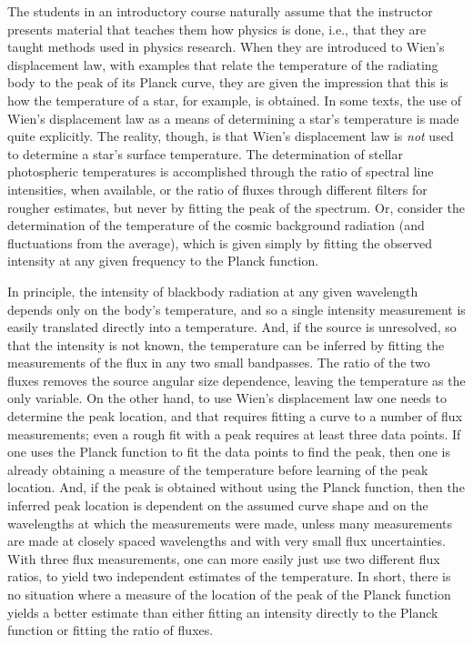\documentclass[12pt,aps,prb,preprint]{revtex4}   %
\begin{document}
The students in an introductory course naturally assume that the instructor presents material that teaches them how physics is done, i.e., that they are taught methods used in physics research.   When they are introduced to Wien's displacement law, with examples that relate the temperature of the radiating body to the peak of its Planck curve, they are given the impression that this is how the temperature of a star, for example, is obtained. In some texts, the use of Wien's displacement law as a means of determining a star's temperature is made quite explicitly.\cite{AS,CM,Hester}  The reality, though, is that Wien's displacement law is {\it not} used to determine a star's surface temperature.  The determination of stellar photospheric temperatures is accomplished through the ratio of spectral line intensities, when available, or the ratio of fluxes through different filters for rougher estimates, but never by fitting the peak of the spectrum.  Or, consider the determination of the temperature of the cosmic background radiation (and fluctuations from the average), which is given simply by fitting the observed intensity at any given frequency to the Planck function.  

In principle, the intensity of blackbody radiation at any given wavelength depends only on the body's temperature, and so a single intensity measurement is easily translated directly into a temperature.  And, if the source is unresolved, so that the intensity is not known, the temperature can be inferred by fitting the measurements of the flux in any two small bandpasses.  The ratio of the two fluxes removes the source angular size dependence, leaving the temperature as the only variable.  On the other hand, to use Wien's displacement law one needs to determine the peak location, and that requires fitting a curve to a number of flux measurements; even a rough fit with a peak requires at least three data points.  If one uses the Planck function to fit the data points to find the peak, then one is already obtaining a measure of the temperature before learning of the peak location.  And, if the peak is obtained without using the Planck function, then the inferred peak location is dependent on the assumed curve shape and on the wavelengths at which the measurements were made, unless many measurements are made at closely spaced wavelengths and with very small flux uncertainties.  With three flux measurements, one can more easily just use two different flux ratios, to yield two independent estimates of the temperature.  In short, there is no situation where a measure of the location of the peak of the Planck function yields a better estimate than either fitting an intensity directly to the Planck function or fitting the ratio of fluxes.  
\end{document}
